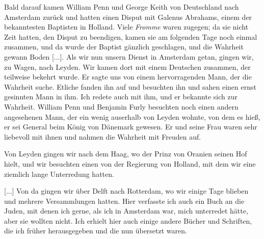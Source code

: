 Bald darauf kamen William Penn 
und George Keith von
Deutschland nach Amsterdam zurück 
und hatten einen Disput mit
Galenus Abrahams, einem 
der bekanntesten Baptisten in Holland.
Viele \textit{Fromme} waren zugegen; da sie nicht Zeit hatten, den
Disput zu beendigen, kamen sie am folgenden Tage noch einmal
zusammen, und da wurde der Baptist gänzlich geschlagen, und die
Wahrheit gewann Boden [...]. Als wir nun unsern Dienst in
Amsterdam getan, gingen wir, zu Wagen, nach Leyden. Wir
kamen dort mit einem Deutschen zusammen, der teilweise bekehrt
wurde. Er sagte uns von einem hervorragenden Mann, der die
Wahrheit suche. Etliche fanden ihn auf und besuchten ihn und
sahen einen ernst gesinnten Mann in ihm. Ich redete auch mit
ihm, und er bekannte sich zur Wahrheit. William Penn und Benjamin
Furly besuchten noch einen andern 
angesehenen Mann, der ein wenig
auserhalb von Leyden wohnte, von dem es hieß, er sei General
beim König von Dänemark gewesen. Er und seine Frau waren
sehr liebevoll mit ihnen und nahmen die Wahrheit mit Freuden auf.

Von Leyden gingen wir nach dem Haag, wo der Prinz von
Oranien seinen Hof hielt, und 
wir besuchten einen von der Regierung
von Holland, mit dem wir eine ziemlich lange Unterredung hatten.

[...] Von da gingen wir über Delft nach Rotterdam, wo wir
einige Tage blieben und mehrere Versammlungen hatten. Hier
verfasste ich auch ein Buch an die Juden, mit denen ich gerne,
als ich in Amsterdam war, mich unterredet hätte, aber sie wollten
nicht. Ich erhielt hier auch einige andere Bücher und Schriften,
die ich früher herausgegeben und die nun übersetzt waren.
